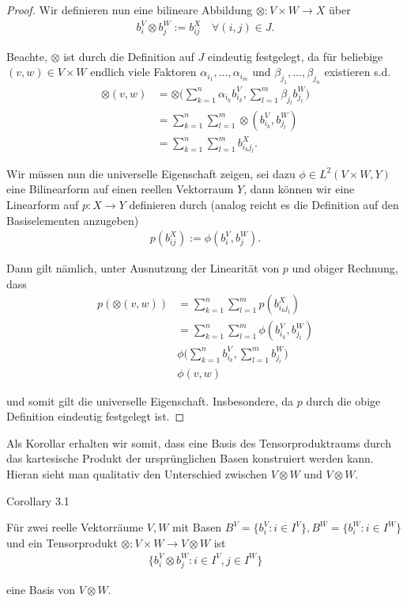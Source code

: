 \begin{proof}
\par
Wir definieren nun eine bilineare Abbildung \(\otimes: V\times W\to X\) über
\begin{align*}
b_i^V \otimes b_j^W := b_{ij}^X\quad\forall (i,j)\in J.
\end{align*}
\par
Beachte, \(\otimes\) ist durch die Definition auf \(J\) eindeutig festgelegt, da für beliebige \((v,w)\in V\times W\) endlich viele Faktoren
\(\alpha_{i_1},\ldots,\alpha_{i_m}\) und \(\beta_{j_1},\ldots, \beta_{j_n}\) existieren s.d.
\begin{align*}
\otimes(v,w) 
&= 
\otimes\big(\sum_{k=1}^n \alpha_{i_k} b_{i_k}^V, \sum_{l=1}^m \beta_{j_l} b_{j_l}^W\big) 
\\&= 
\sum_{k=1}^n \sum_{l=1}^m \otimes\left(b_{i_k}^V, b_{j_l}^W\right)
\\&=
\sum_{k=1}^n \sum_{l=1}^m b_{i_kj_l}^X.
\end{align*}
\par
Wir müssen nun die universelle Eigenschaft zeigen, sei dazu \(\phi\in L^2(V\times W, Y)\) eine Bilinearform auf einen reellen Vektorraum \(Y\), dann können wir eine Linearform auf \(p:X\to Y\) definieren durch (analog reicht es die Definition auf den Basiselementen anzugeben)
\begin{align*}
p(b_{ij}^X) := \phi(b_i^V, b_j^W).
\end{align*}
\par
Dann gilt nämlich, unter Ausnutzung der Linearität von \(p\) und obiger Rechnung, dass
\begin{align*}
p(\otimes(v,w)) 
&=
\sum_{k=1}^n \sum_{l=1}^m p(b_{i_kj_l}^X)
\\&=
\sum_{k=1}^n \sum_{l=1}^m \phi\left(b_{i_k}^V, b_{j_l}^W\right)
\\&
\phi\big(\sum_{k=1}^n  b_{i_k}^V,\sum_{l=1}^m b_{j_l}^W\big)
\\&
\phi(v,w)
\end{align*}
\par
und somit gilt die universelle Eigenschaft. Insbesondere, da \(p\) durch die obige Definition eindeutig festgelegt ist.
\end{proof}

\par
Als Korollar erhalten wir somit, dass eine Basis des Tensorproduktraums durch das kartesische Produkt der ursprünglichen Basen konstruiert werden kann. Hieran sieht man qualitativ den Unterschied zwischen \(V\otimes W\) und \(V\otimes W\).
\label{vektoranalysis/tensor:corollary-3}
\begin{emphBox}{}{}{Corollary 3.1}



\par
Für zwei reelle Vektorräume \(V,W\) mit Basen \(B^V = \{b_i^V: i\in I^V\}, B^W = \{b_i^W: i\in I^W\}\) und ein Tensorprodukt \(\otimes:V\times W\to V\otimes W\) ist
\begin{align*}
\{b_i^V\otimes b_j^W: i\in I^V, j\in I^W\}
\end{align*}
\par
eine Basis von \(V\otimes W\).
\end{emphBox}

